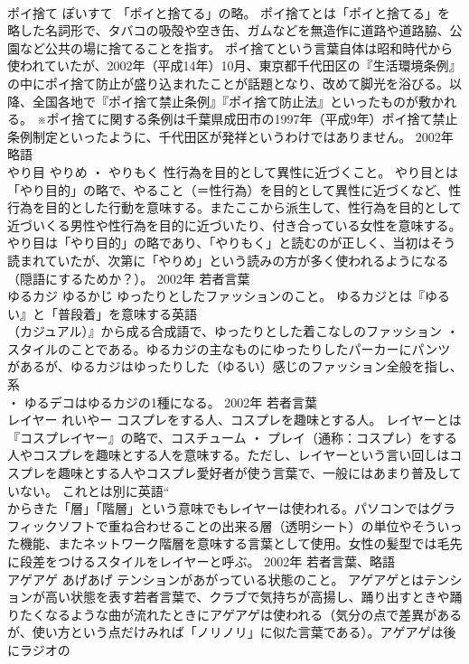 \documentclass[8pt]{extreport}
\begin{document}
\begin{CJK}{UTF8}{min}
\\	ポイ捨て	ぽいすて	「ポイと捨てる」の略。	ポイ捨てとは「ポイと捨てる」を略した名詞形で、タバコの吸殻や空き缶、ガムなどを無造作に道路や道路脇、公園など公共の場に捨てることを指す。 ポイ捨てという言葉自体は昭和時代から使われていたが、2002年（平成14年）10月、東京都千代田区の『生活環境条例』の中にポイ捨て防止が盛り込まれたことが話題となり、改めて脚光を浴びる。以降、全国各地で『ポイ捨て禁止条例』『ポイ捨て防止法』といったものが敷かれる。 ※ポイ捨てに関する条例は千葉県成田市の1997年（平成9年）ポイ捨て禁止条例制定といったように、千代田区が発祥というわけではありません。	2002年	略語	
\\	やり目	やりめ ・ やりもく	性行為を目的として異性に近づくこと。	やり目とは「やり目的」の略で、やること（＝性行為）を目的として異性に近づくなど、性行為を目的とした行動を意味する。またここから派生して、性行為を目的として近づいくる男性や性行為を目的に近づいたり、付き合っている女性を意味する。やり目は「やり目的」の略であり、「やりもく」と読むのが正しく、当初はそう読まれていたが、次第に「やりめ」という読みの方が多く使われるようになる（隠語にするためか？）。	2002年	若者言葉	
\\	ゆるカジ	ゆるかじ	ゆったりとしたファッションのこと。	ゆるカジとは『ゆるい』と「普段着」を意味する英語
\\	（カジュアル）』から成る合成語で、ゆったりとした着こなしのファッション ・ スタイルのことである。ゆるカジの主なものにゆったりしたパーカーにパンツがあるが、ゆるカジはゆったりした（ゆるい）感じのファッション全般を指し、
\\	系
\\	・ ゆるデコはゆるカジの1種になる。	2002年	若者言葉	
\\	レイヤー	れいやー	コスプレをする人、コスプレを趣味とする人。	レイヤーとは『コスプレイヤー』の略で、コスチューム ・ プレイ（通称：コスプレ）をする人やコスプレを趣味とする人を意味する。ただし、レイヤーという言い回しはコスプレを趣味とする人やコスプレ愛好者が使う言葉で、一般にはあまり普及していない。 これとは別に英語“
\\	からきた「層」「階層」という意味でもレイヤーは使われる。パソコンではグラフィックソフトで重ね合わせることの出来る層（透明シート）の単位やそういった機能、またネットワーク階層を意味する言葉として使用。女性の髪型では毛先に段差をつけるスタイルをレイヤーと呼ぶ。	2002年	若者言葉、略語	
\\	アゲアゲ	あげあげ	テンションがあがっている状態のこと。	アゲアゲとはテンションが高い状態を表す若者言葉で、クラブで気持ちが高揚し、踊り出すときや踊りたくなるような曲が流れたときにアゲアゲは使われる（気分の点で差異があるが、使い方という点だけみれば「ノリノリ」に似た言葉である）。アゲアゲは後にラジオの

\end{CJK}
\end{document}
